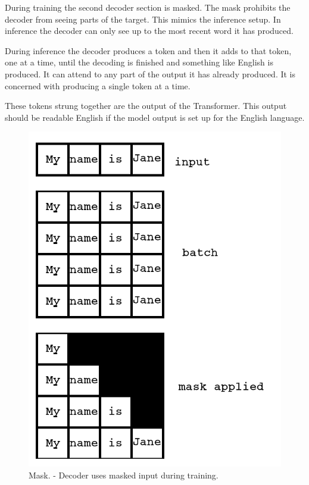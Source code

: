 During training the second decoder section is masked. The mask prohibits the decoder from seeing parts of the target. This mimics the inference setup. In inference the decoder can only see up to the most recent word it has produced.

During inference the decoder produces a token and then it adds to that token, one at a time, until the decoding is finished and something like English is produced. It can attend to any part of the output it has already produced. It is concerned with producing a single token at a time.

These tokens strung together are the output of the Transformer. This output should be readable English if the model output is set up for the English language.

\begin{figure}[H]
	\begin{center}
		
		
		\includegraphics[scale=1.25]{diagram-mask01}
	\end{center}
	\caption[Decoder Mask]{Mask. - Decoder uses masked input during training.}
	
	\label{diagram-mask-01}
\end{figure}



